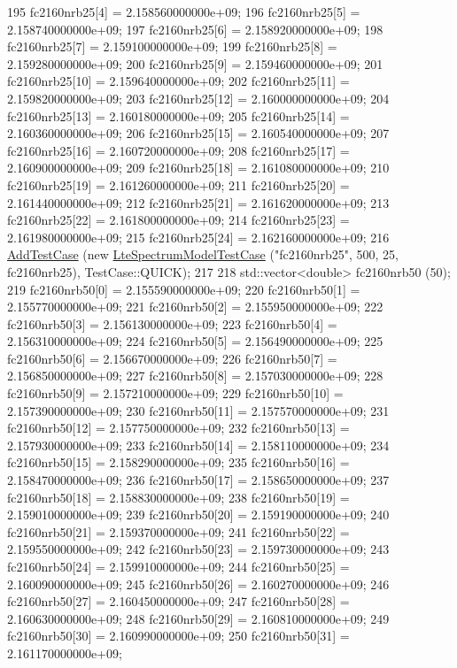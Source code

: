 \begin{DoxyCode}
195   fc2160nrb25[4] = 2.158560000000e+09;
196   fc2160nrb25[5] = 2.158740000000e+09;
197   fc2160nrb25[6] = 2.158920000000e+09;
198   fc2160nrb25[7] = 2.159100000000e+09;
199   fc2160nrb25[8] = 2.159280000000e+09;
200   fc2160nrb25[9] = 2.159460000000e+09;
201   fc2160nrb25[10] = 2.159640000000e+09;
202   fc2160nrb25[11] = 2.159820000000e+09;
203   fc2160nrb25[12] = 2.160000000000e+09;
204   fc2160nrb25[13] = 2.160180000000e+09;
205   fc2160nrb25[14] = 2.160360000000e+09;
206   fc2160nrb25[15] = 2.160540000000e+09;
207   fc2160nrb25[16] = 2.160720000000e+09;
208   fc2160nrb25[17] = 2.160900000000e+09;
209   fc2160nrb25[18] = 2.161080000000e+09;
210   fc2160nrb25[19] = 2.161260000000e+09;
211   fc2160nrb25[20] = 2.161440000000e+09;
212   fc2160nrb25[21] = 2.161620000000e+09;
213   fc2160nrb25[22] = 2.161800000000e+09;
214   fc2160nrb25[23] = 2.161980000000e+09;
215   fc2160nrb25[24] = 2.162160000000e+09;
216   \hyperlink{classns3_1_1TestCase_a3718088e3eefd5d6454569d2e0ddd835}{AddTestCase} (\textcolor{keyword}{new} \hyperlink{classLteSpectrumModelTestCase}{LteSpectrumModelTestCase} (\textcolor{stringliteral}{"fc2160nrb25"}, 500, 25, 
      fc2160nrb25), TestCase::QUICK);
217 
218   std::vector<double> fc2160nrb50 (50);
219   fc2160nrb50[0] = 2.155590000000e+09;
220   fc2160nrb50[1] = 2.155770000000e+09;
221   fc2160nrb50[2] = 2.155950000000e+09;
222   fc2160nrb50[3] = 2.156130000000e+09;
223   fc2160nrb50[4] = 2.156310000000e+09;
224   fc2160nrb50[5] = 2.156490000000e+09;
225   fc2160nrb50[6] = 2.156670000000e+09;
226   fc2160nrb50[7] = 2.156850000000e+09;
227   fc2160nrb50[8] = 2.157030000000e+09;
228   fc2160nrb50[9] = 2.157210000000e+09;
229   fc2160nrb50[10] = 2.157390000000e+09;
230   fc2160nrb50[11] = 2.157570000000e+09;
231   fc2160nrb50[12] = 2.157750000000e+09;
232   fc2160nrb50[13] = 2.157930000000e+09;
233   fc2160nrb50[14] = 2.158110000000e+09;
234   fc2160nrb50[15] = 2.158290000000e+09;
235   fc2160nrb50[16] = 2.158470000000e+09;
236   fc2160nrb50[17] = 2.158650000000e+09;
237   fc2160nrb50[18] = 2.158830000000e+09;
238   fc2160nrb50[19] = 2.159010000000e+09;
239   fc2160nrb50[20] = 2.159190000000e+09;
240   fc2160nrb50[21] = 2.159370000000e+09;
241   fc2160nrb50[22] = 2.159550000000e+09;
242   fc2160nrb50[23] = 2.159730000000e+09;
243   fc2160nrb50[24] = 2.159910000000e+09;
244   fc2160nrb50[25] = 2.160090000000e+09;
245   fc2160nrb50[26] = 2.160270000000e+09;
246   fc2160nrb50[27] = 2.160450000000e+09;
247   fc2160nrb50[28] = 2.160630000000e+09;
248   fc2160nrb50[29] = 2.160810000000e+09;
249   fc2160nrb50[30] = 2.160990000000e+09;
250   fc2160nrb50[31] = 2.161170000000e+09;

\end{DoxyCode}
